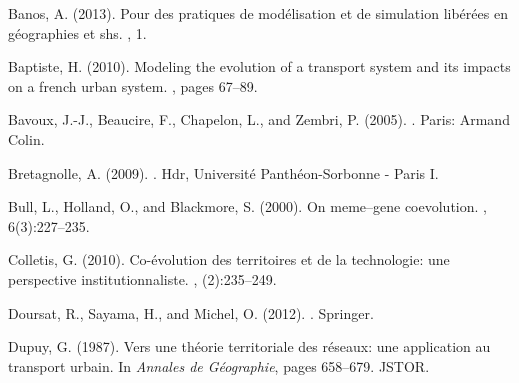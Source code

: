 \documentclass[11pt]{article}
\begin{document}




%
%

\begin{thebibliography}{}

Banos, A. (2013).
\newblock Pour des pratiques de mod{\'e}lisation et de simulation
  lib{\'e}r{\'e}es en g{\'e}ographies et shs.
, 1.

Baptiste, H. (2010).
\newblock Modeling the evolution of a transport system and its impacts on a
  french urban system.
, pages
  67--89.

Bavoux, J.-J., Beaucire, F., Chapelon, L., and Zembri, P. (2005).
.
\newblock Paris: Armand Colin.

Bretagnolle, A. (2009).
.
\newblock Hdr, Universit{\'e} Panth{\'e}on-Sorbonne - Paris I.

Bull, L., Holland, O., and Blackmore, S. (2000).
\newblock On meme--gene coevolution.
, 6(3):227--235.

Colletis, G. (2010).
\newblock Co-{\'e}volution des territoires et de la technologie: une
  perspective institutionnaliste.
, (2):235--249.

Doursat, R., Sayama, H., and Michel, O. (2012).
.
\newblock Springer.

Dupuy, G. (1987).
\newblock Vers une th{\'e}orie territoriale des r{\'e}seaux: une application au
  transport urbain.
\newblock In {\em Annales de G{\'e}ographie}, pages 658--679. JSTOR.


\end{thebibliography}
\end{document}
